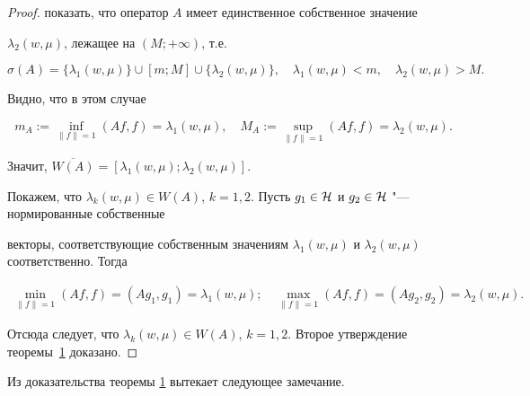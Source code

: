 \begin{proof}
показать, что оператор $A$ имеет единственное собственное значение

$\lambda_2(w, \mu)$, лежащее на $(M; +\infty)$, т.е.

$$

\sigma(A)=\{ \lambda_1(w, \mu) \} \cup [m; M] \cup \{ \lambda_2(w,

\mu) \},\quad \lambda_1(w, \mu)<m, \quad \lambda_2(w, \mu)>M.

$$

Видно, что в этом случае

\begin{equation}

m_A:=\inf_{\|f\|=1} (Af,f)=\lambda_1(w, \mu),\quad

M_A:=\sup_{\|f\|=1} (Af,f)=\lambda_2(w, \mu). \label{eq:RD:5}

\end{equation}

Значит, $\overline{W(A)}=[\lambda_1(w, \mu); \lambda_2(w, \mu)]$.

Покажем, что $\lambda_{k}(w, \mu) \in W(A)$, $k=1,2$. Пусть $g_1

\in {\cal H} $ и $g_2 \in {\cal H}$ "--- нормированные собственные

векторы, соответствующие собственным значениям $\lambda_1(w,

\mu)$ и $\lambda_2(w, \mu)$ соответственно. Тогда

\begin{gather*}

\min\limits_{\|f\|=1} (Af,f)=(Ag_1,g_1)=\lambda_1(w, \mu);\quad

\max\limits_{\|f\|=1} (Af,f)=(Ag_2,g_2)=\lambda_2(w, \mu).

\end{gather*}

Отсюда следует, что $\lambda_k(w, \mu) \in W(A)$, $k=1, 2$. Второе утверждение теоремы~\hyperlink{RD:th1}{1} доказано.

\end{proof}



\smallskip



Из доказательства теоремы \hyperlink{RD:th1}{1} вытекает следующее замечание.



\smallskip



\hypertarget{DR:zam1}{}



